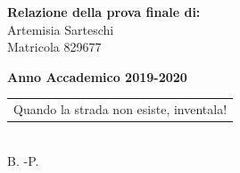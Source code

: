 \documentclass[11pt,oneside]{book}
\begin{document}
\begin{titlepage}
        \vspace{15mm}
    
        \begin{flushright}
            {\large \textbf{Relazione della prova finale di:}} \\
            \large{Artemisia  Sarteschi} \\
            \large{Matricola 829677} 
        \end{flushright}
            
        \vspace{11mm}
        \begin{center}
            {\large{\bf Anno Accademico 2019-2020}}
        \end{center}
    
        \restoregeometry
            
    \end{titlepage}

\cleardoublepage
\thispagestyle{empty}
\begin{flushright}
\itshape
\begin{tabular}{@{}l@{}}
Quando la strada non esiste, inventala! \\
\end{tabular}\\[3pt]
B. -P. \\


\end{flushright}
\cleardoublepage

\thispagestyle{empty}
\frontmatter
\tableofcontents



\end{document}
